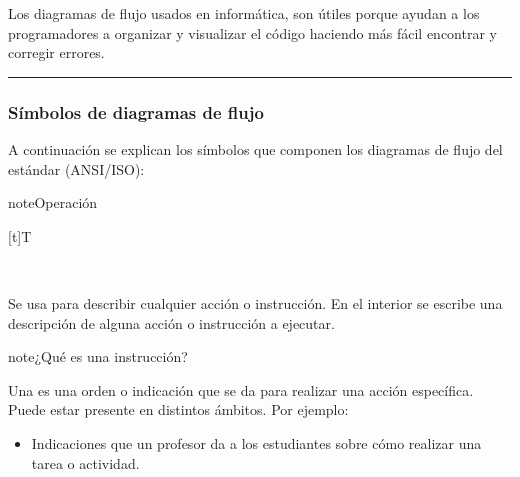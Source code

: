 \documentclass[letterpaper,10pt,spanish]{sphinxmanual}
\let\sphinxpxdimen\pdfpxdimen\else\newdimen\sphinxpxdimen
\begin{document}
\sphinxAtStartPar
Los diagramas de flujo usados en informática, son útiles porque ayudan a los programadores a organizar y visualizar el código haciendo más fácil encontrar y corregir errores.


\bigskip\hrule\bigskip



\subsubsection{Símbolos de diagramas de flujo}
\label{\detokenize{1_guias/10programacion/G1023:simbolos-de-diagramas-de-flujo}}
\sphinxAtStartPar
A continuación se explican los símbolos que componen los diagramas de flujo del estándar (ANSI/ISO):

\begin{sphinxadmonition}{note}{Operación}


\begin{savenotes}\sphinxattablestart
\sphinxthistablewithglobalstyle
\centering
\begin{tabulary}{\linewidth}[t]{T}
\sphinxtoprule
\sphinxtableatstartofbodyhook

\begin{sphinxfigure-in-table}
\centering
\capstart
\noindent\sphinxincludegraphics[width=250\sphinxpxdimen]{{image0111}.png}
\label{\detokenize{1_guias/10programacion/G1023:id5}}\end{sphinxfigure-in-table}\relax
\\
\sphinxbottomrule
\end{tabulary}
\sphinxtableafterendhook\par
\sphinxattableend\end{savenotes}

\sphinxAtStartPar
Se usa para describir cualquier acción o instrucción. En el interior se escribe una descripción de alguna acción o instrucción a ejecutar.

\begin{sphinxadmonition}{note}{¿Qué es una instrucción?}

\sphinxAtStartPar
Una  es una orden o indicación que se da para realizar una acción específica. Puede estar presente en distintos ámbitos. Por ejemplo:
\begin{itemize}
\item {} 
\sphinxAtStartPar
{} Indicaciones que un profesor da a los estudiantes sobre cómo realizar una tarea o actividad.


\end{itemize}
\end{sphinxadmonition}
\end{sphinxadmonition}
\end{document}
